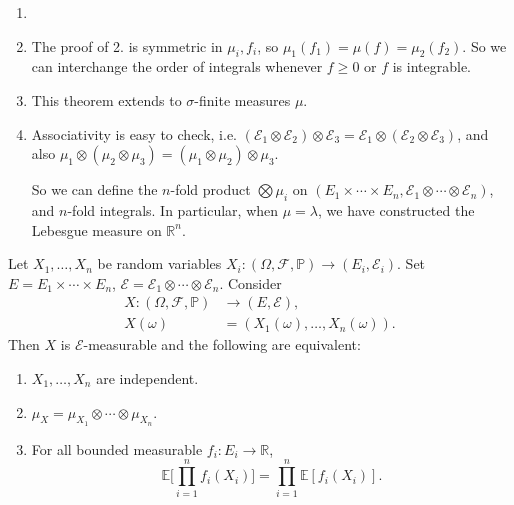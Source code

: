 \documentclass[12pt]{article}
\begin{document}
\begin{remark}
	\begin{enumerate}
		\item[]
		\item The proof of 2. is symmetric in $\mu_i, f_i$, so $\mu_1(f_1) = \mu(f) = \mu_2(f_2)$. So we can interchange the order of integrals whenever $f \geq 0$ or $f$ is integrable.
		\item This theorem extends to $\sigma$-finite measures $\mu$.
		\item Associativity is easy to check, i.e. $(\mathcal{E}_1 \otimes \mathcal{E}_2) \otimes \mathcal{E}_3 = \mathcal{E}_1 \otimes (\mathcal{E}_2 \otimes \mathcal{E}_3)$, and also $\mu_1 \otimes (\mu_2 \otimes \mu_3) = (\mu_1 \otimes \mu_2) \otimes \mu_3$.

			So we can define the $n$-fold product $\bigotimes \mu_i$ on $(E_1 \times \cdots \times E_n, \mathcal{E}_1 \otimes \cdots \otimes \mathcal{E}_n)$, and $n$-fold integrals. In particular, when $\mu = \lambda$, we have constructed the Lebesgue measure on $\mathbb{R}^{n}$.
	\end{enumerate}
\end{remark}


\begin{proposition}
	Let $X_1, \ldots, X_n$ be random variables $X_i : (\Omega, \mathcal{F}, \mathbb{P}) \to (E_i, \mathcal{E}_i)$. Set $E = E_1 \times \cdots \times E_n$, $\mathcal{E} = \mathcal{E}_1 \otimes \cdots \otimes \mathcal{E}_n$. Consider
	\begin{align*}
		X : (\Omega, \mathcal{F}, \mathbb{P}) &\to (E, \mathcal{E}), \\
		X(\omega) &= (X_1(\omega), \ldots, X_n(\omega)).
	\end{align*}
	Then $X$ is $\mathcal{E}$-measurable and the following are equivalent:
	\begin{enumerate}[\normalfont(a)]
		\item $X_1, \ldots, X_n$ are independent.
		\item $\mu_X = \mu_{X_1} \otimes \cdots \otimes \mu_{X_n}$.
		\item For all bounded measurable $f_i : E_i \to \mathbb{R}$,
			\[
			\mathbb{E}\Biggl[ \prod_{i = 1}^{n} f_i(X_i) \Biggr] = \prod_{i = 1}^{n} \mathbb{E}[f_i(X_i)].
			\]
	\end{enumerate}
\end{proposition}
\end{document}
